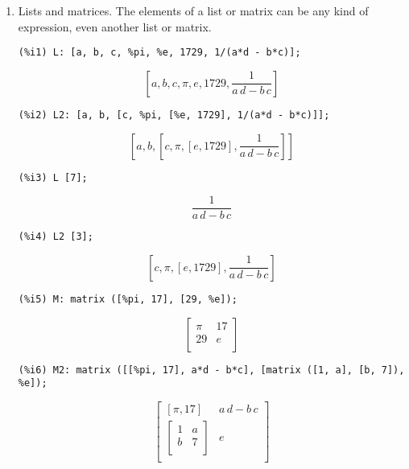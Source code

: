 \documentclass[12pt,leqno]{article}
\begin{document}
\begin{enumerate}
\item Lists and matrices.
The elements of a list or matrix can be any kind of expression,
even another list or matrix.
\begin{verbatim}
(%i1) L: [a, b, c, %pi, %e, 1729, 1/(a*d - b*c)];
\end{verbatim}
\begin{equation}
\left[ a , b , c , \pi , e , 1729 , \frac{1}{a\,d-b\,c} \right] \tag{\%o1}
\label{eq:doc-group1-code8-1-1}
\end{equation}
\begin{verbatim}
(%i2) L2: [a, b, [c, %pi, [%e, 1729], 1/(a*d - b*c)]];
\end{verbatim}
\begin{equation}
\left[ a , b , \left[ c , \pi , \left[ e , 1729 \right]  , \frac{1}{a\,d-b\,c} \right]  \right] \tag{\%o2}
\label{eq:doc-group1-code8-2-1}
\end{equation}
\begin{verbatim}
(%i3) L [7];
\end{verbatim}
\begin{equation}
\frac{1}{a\,d-b\,c}\tag{\%o3}
\label{eq:doc-group1-code8-3-1}
\end{equation}
\begin{verbatim}
(%i4) L2 [3];
\end{verbatim}
\begin{equation}
\left[ c , \pi , \left[ e , 1729 \right]  , \frac{1}{a\,d-b\,c} \right] \tag{\%o4}
\label{eq:doc-group1-code8-4-1}
\end{equation}
\begin{verbatim}
(%i5) M: matrix ([%pi, 17], [29, %e]);
\end{verbatim}
\begin{equation}
\begin{bmatrix}\pi & 17 \\ 29 & e \\ \end{bmatrix}\tag{\%o5}
\label{eq:doc-group1-code8-5-1}
\end{equation}
\begin{verbatim}
(%i6) M2: matrix ([[%pi, 17], a*d - b*c], [matrix ([1, a], [b, 7]), %e]);
\end{verbatim}
\begin{equation}
\begin{bmatrix}\left[ \pi , 17 \right]  & a\,d-b\,c \\ \begin{bmatrix}1 & a \\ b & 7 \\ \end{bmatrix} & e \\ \end{bmatrix}\tag{\%o6}

\end{equation}
\end{enumerate}
\end{document}
